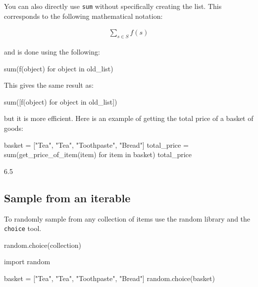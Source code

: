 You can also directly use \texttt{sum} without specifically creating the list. This
corresponds to the following mathematical notation:

\begin{equation*}
\begin{split}
    \sum_{s\in S}f(s)
\end{split}
\end{equation*}

and is done using the following:

\begin{pyin}
sum(f(object) for object in old_list)
\end{pyin}


This gives the same result as:

\begin{pyin}
sum([f(object) for object in old_list])
\end{pyin}


but it is more efficient.
Here is an example of getting the total price of a basket of goods:




\begin{pyin}
basket = ["Tea", "Tea", "Toothpaste", "Bread"]
total_price = sum(get_price_of_item(item) for item in basket)
total_price
\end{pyin}





\begin{raw}
6.5
\end{raw}





\subsection{Sample from an iterable}
\label{\detokenize{tools-for-mathematics/06-probability/how/main:sample-from-an-iterable}}

To randomly sample from any collection of items
use the random library and the \texttt{choice} tool.


\begin{api}
random.choice(collection)
\end{api}






\begin{pyin}
import random

basket = ["Tea", "Tea", "Toothpaste", "Bread"]
random.choice(basket)
\end{pyin}





